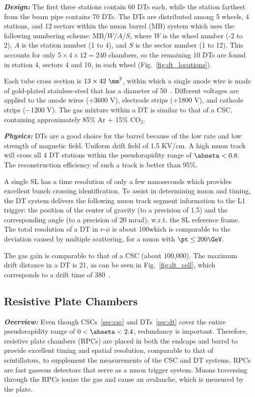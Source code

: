 \textbf{\textit{Design:}}
The first three stations contain 60 DTs each, while the station farthest from the beam pipe contains 70 DTs.
The DTs are distributed among 5 wheels, 4 stations, and 12 sectors within the muon barrel (MB) system which uses the following numbering scheme:
MB/$W$/$A$/$S$,
where $W$ is the wheel number (-2 to 2),
$A$ is the station number (1 to 4),
and $S$ is the sector number (1 to 12).
This accounts for only $5 \times 4 \times 12 = 240$ chambers, so the remaining 10 DTs are found in station 4, sectors 4 and 10, in each wheel (Fig.~\ref{fig:dt_locations}).

Each tube cross section is $13 \times 42~\mm^{2}$, within which a single anode wire is made of gold-plated stainless-steel that has a diameter of 50~\mum.
Different voltages are applied to the anode wires ($+$3600 V), electrode strips ($+$1800 V), and cathode strips ($-$1200 V).
The gas mixture within a DT is similar to that of a CSC, containing approximately 85\% Ar $+$ 15\% CO$_{2}$.

\textbf{\textit{Physics:}}
DTs are a good choice for the barrel because of the low rate and low strength of magnetic field.
Uniform drift field of 1.5 KV/cm.
A high \pt muon track will cross all 4 DT stations within the pseudorapidity range of $\abseta < 0.8$.
The reconstruction efficiency of such a track is better than 95\%.

A single SL has a time resolution of only a few nanoseconds which provides excellent bunch crossing identification.
To assist in determining muon \pt and timing, the DT system delivers the following muon track segment information to the L1 trigger:
the position of the center of gravity (to a precision of 1.5\mm) and the corresponding angle (to a precision of 20 mrad), w.r.t. the SL reference frame.
The total resolution of a DT in $r$-$\phi$ is about 100\mum which is comparable to the deviation caused by multiple scattering, for a muon with $\pt \le 200\GeV$.

The gas gain is comparable to that of a CSC (about 100,000). The maximum drift distance in a DT is 21\mm, as can be seen in Fig.~\ref{fig:dt_cell}, which corresponds to a drift time of 380~\ns.

\subsection{Resistive Plate Chambers}
\label{sec:rpc}

\textbf{\textit{Overview:}}
Even though CSCs~\ref{sec:csc} and DTs~\ref{sec:dt} cover the entire pseudorapidity range of $0 < \abseta < 2.4$, redundancy is important.
Therefore, resistive plate chambers (RPCs) are placed in both the endcaps and barrel to provide excellent timing and spatial resolution, comparable to that of scintillators, to supplement the measurements of the CSC and DT systems.
RPCs are fast gaseous detectors that serve as a muon trigger system. Muons traversing through the RPCs ionize the gas and cause an avalanche, which is measured by the plate.

